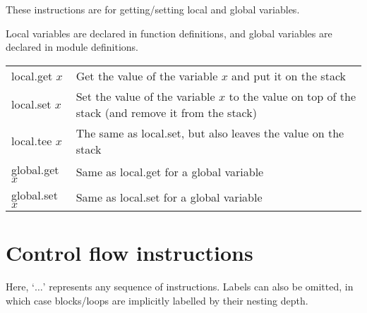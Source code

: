 \documentclass[10pt,a4paper]{article}
\begin{document}
These instructions are for getting/setting local and global variables.

Local variables are declared in function definitions, and global variables are declared in module definitions.

\begin{xltabular}{\textwidth}{>{\sffamily}lX}
\toprule
local.get $x$ & Get the value of the variable $x$ and put it on the stack \\
local.set $x$ & Set the value of the variable $x$ to the value on top of the stack (and remove it from the stack) \\
local.tee $x$ & The same as \textsf{local.set}, but also leaves the value on the stack \\
global.get $x$ & Same as \textsf{local.get} for a global variable \\
global.set $x$ & Same as \textsf{local.set} for a global variable \\
\bottomrule
\end{xltabular}

\section*{Control flow instructions}

Here, `$\ldots$' represents any sequence of instructions. Labels can also be omitted, in which case blocks/loops are implicitly labelled by their nesting depth.
\end{document}
